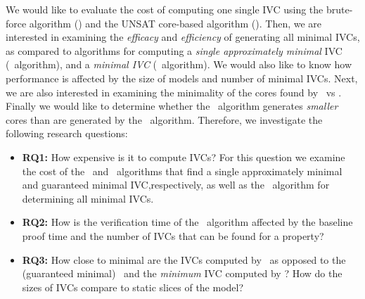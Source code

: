 We would like to evaluate the cost of computing one single IVC using the brute-force
algorithm (\ucbfalg) and the UNSAT core-based algorithm (\ucalg).
Then, we are interested in examining the {\em efficacy} and {\em efficiency} of generating all minimal IVCs, as compared to algorithms for computing a {\em single approximately minimal} IVC (\ucalg\ algorithm), and a {\em minimal IVC} (\ucbfalg\ algorithm).  We would also like to know how performance is affected by the size of models and number of minimal IVCs.  Next, we are also interested in examining the minimality of the cores found by \ucbfalg\ vs  \ucalg . Finally we would like to determine whether the \aivcalg\ algorithm generates {\em smaller} cores than are generated by the \ucbfalg\ algorithm.  %
%
%
Therefore, we investigate the following research questions:
\begin{itemize}
  \item \textbf{RQ1:} How expensive is it to compute IVCs?  For this question we examine the cost of the \ucalg ~and \ucbfalg ~algorithms that find a single approximately minimal and guaranteed minimal IVC,respectively, as well as the \aivcalg ~algorithm for determining all minimal IVCs.
  \item \textbf{RQ2:} How is the verification time of the \aivcalg ~algorithm affected by the baseline proof time and the number of IVCs that can be found for a property?
   \item \textbf{RQ3:} How close to minimal are the IVCs computed by \ucalg\ as opposed to the (guaranteed minimal) \ucbfalg\ and the \emph{minimum} IVC computed by \aivcalg ?  How do the sizes of IVCs compare to static slices of the model?
%
\end{itemize}


